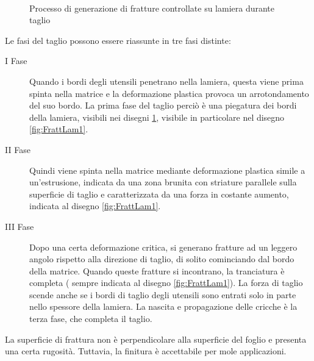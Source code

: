 \begin{figure}
\centering
{}\quad
{}\quad
{}\\
\caption{Processo di generazione di fratture controllate su lamiera durante taglio}
\label{fig:FrattLam}
\end{figure}

Le fasi del taglio possono essere riassunte in tre fasi distinte:
\begin{description}
\item[I Fase]Quando i bordi degli utensili penetrano nella lamiera, questa viene prima spinta nella matrice e la deformazione plastica provoca un arrotondamento del suo bordo. 
La prima fase del taglio perciò è una piegatura dei bordi della lamiera, visibili nei disegni \ref{fig:FrattLam},  visibile in particolare nel disegno \ref{fig:FrattLam1}.
\item[II Fase] Quindi viene spinta nella matrice mediante deformazione plastica simile a un'estrusione, indicata da una zona brunita con striature parallele sulla superficie di taglio e caratterizzata da una forza in costante aumento,  indicata al disegno \ref{fig:FrattLam1}. 
\item[III Fase] Dopo una certa deformazione critica, si generano fratture ad un leggero angolo rispetto alla direzione di taglio, di solito cominciando dal bordo della matrice.
Quando queste fratture si incontrano, la tranciatura è completa ( sempre indicata al disegno \ref{fig:FrattLam1}). La forza di taglio scende anche se i bordi di taglio degli utensili sono entrati solo in parte nello spessore della lamiera. La nascita e propagazione delle cricche è la terza fase, che completa il taglio.
\end{description}

La superficie di frattura non è perpendicolare alla superficie del foglio e presenta una certa rugosità. Tuttavia, la finitura è accettabile per mole applicazioni.

